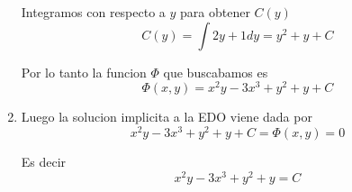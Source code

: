 \documentclass[a4paper,oneside,10.5pt]{article}
\begin{document}
\begin{ejemplo}
\begin{enumerate}
          Integramos con respecto a $y$ para obtener $C(y)$
          \begin{equation*}
            C(y) = \int 2y + 1 dy = y^{2} + y + C
          \end{equation*}

          Por lo tanto la funcion $\Phi$ que buscabamos es
          \begin{equation*}
            \Phi(x, y) = x^{2}y - 3x^{3} + y^{2} + y + C
          \end{equation*}

    \item Luego la solucion implicita a la EDO viene dada por
          \begin{equation*}
            x^{2}y - 3x^{3} + y^{2} + y + C = \Phi(x, y) = 0
          \end{equation*}

          Es decir
          \begin{equation*}
            x^{2}y - 3x^{3} + y^{2} + y = C
          \end{equation*}
  \end{enumerate}
\end{ejemplo}
\end{document}
